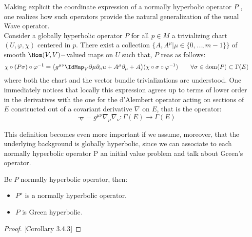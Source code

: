 \documentclass[a4paper,12pt]{scrartcl}    %
\begin{document}
		\begin{observation}%
			Making explicit the coordinate expression of a normally hyperbolic operator $P$ , one realizes how such operators  provide the natural generalization of the usual Wave operator. 
			\\
			Consider a globally hyperbolic operator $P$ for all $p \in M$ a trivializing chart $(U, \varphi, \chi)$ centered in $p$. 
			There exist a collection $\big\{A, A^\mu \vert \mu\in \{0, \ldots ,m-1\}\big\}$ of smooth 
			$\Hom(V,V)-$valued maps on $U$ such that, $P$ reas as follows:
			\begin{displaymath}
				\chi \circ ( P \sigma) \circ \varphi^{-1} =
				\big( g^{\mu \nu} \IdMap_V \partial\mu \partial_nu + A^\mu \partial_\mu + A\big)
				(\chi \circ \sigma \circ \varphi^{-1} ) 
				\qquad \forall \sigma \in \dom(P) \subset \Gamma(E)
			\end{displaymath}
		where both the chart and the vector bundle trivializations are understood. 
		One immediately notices that locally this expression agrees up to terms of lower order in the derivatives with the one for the d'Alembert operator acting on sections of $E$  constructed out of a covariant derivative $\nabla$ on $E$, that is the operator:
		\begin{displaymath}
			\square_\nabla = g^{\mu \nu} \nabla_\mu \nabla_\nu : \Gamma(E) \rightarrow \Gamma(E)
		\end{displaymath}
		\end{observation}
		This definition becomes even more important if we assume, moreover, that the underlying background is globally hyperbolic, since we can associate to each normally hyperbolic operator P an initial value problem and talk about Green's operator.
		\begin{proposition}
			Be $P$ normally hyperbolic operator, then:
			\begin{itemize}
				\item	$P^\star$ is a normally hyperbolic operator.
				\item $P$ is Green hyperbolic.
			\end{itemize}
		\end{proposition}	
		\begin{proof}
			\cite{barwav}[Corollary 3.4.3]
		\end{proof}
		
\end{document}
